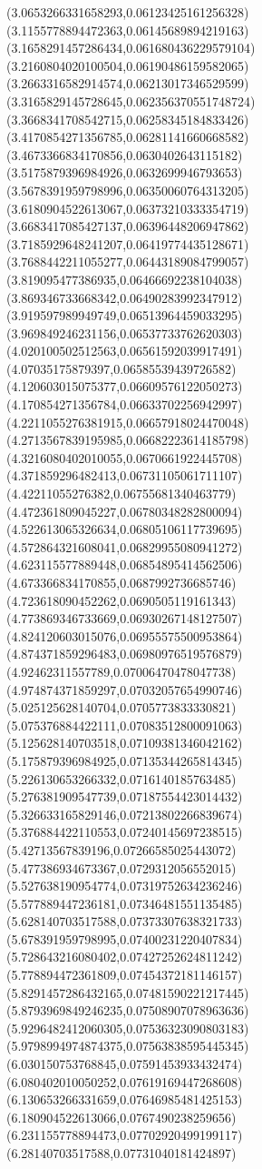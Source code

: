 {(3.0653266331658293,0.06123425161256328)
(3.1155778894472363,0.06145689894219163)
(3.1658291457286434,0.061680436229579104)
(3.2160804020100504,0.06190486159582065)
(3.2663316582914574,0.06213017346529599)
(3.3165829145728645,0.062356370551748724)
(3.3668341708542715,0.06258345184833426)
(3.4170854271356785,0.06281141660668582)
(3.4673366834170856,0.0630402643115182)
(3.5175879396984926,0.0632699946793653)
(3.5678391959798996,0.06350060764313205)
(3.6180904522613067,0.06373210333354719)
(3.6683417085427137,0.06396448206947862)
(3.7185929648241207,0.06419774435128671)
(3.7688442211055277,0.06443189084799057)
(3.819095477386935,0.06466692238104038)
(3.869346733668342,0.06490283992347912)
(3.919597989949749,0.06513964459033295)
(3.969849246231156,0.06537733762620303)
(4.020100502512563,0.06561592039917491)
(4.07035175879397,0.06585539439726582)
(4.120603015075377,0.06609576122050273)
(4.170854271356784,0.06633702256942997)
(4.2211055276381915,0.06657918024470048)
(4.2713567839195985,0.06682223614185798)
(4.3216080402010055,0.0670661922445708)
(4.371859296482413,0.06731105061711107)
(4.42211055276382,0.06755681340463779)
(4.472361809045227,0.06780348282800094)
(4.522613065326634,0.06805106117739695)
(4.572864321608041,0.06829955080941272)
(4.623115577889448,0.06854895414562506)
(4.673366834170855,0.0687992736685746)
(4.723618090452262,0.0690505119161343)
(4.773869346733669,0.06930267148127507)
(4.824120603015076,0.06955575500953864)
(4.874371859296483,0.06980976519576879)
(4.92462311557789,0.07006470478047738)
(4.974874371859297,0.07032057654990746)
(5.025125628140704,0.0705773833330821)
(5.075376884422111,0.07083512800091063)
(5.125628140703518,0.07109381346042162)
(5.175879396984925,0.07135344265814345)
(5.226130653266332,0.0716140185763485)
(5.276381909547739,0.07187554423014432)
(5.326633165829146,0.07213802266839674)
(5.376884422110553,0.07240145697238515)
(5.42713567839196,0.07266585025443072)
(5.477386934673367,0.0729312056552015)
(5.527638190954774,0.07319752634236246)
(5.577889447236181,0.07346481551135485)
(5.628140703517588,0.07373307638321733)
(5.678391959798995,0.07400231220407834)
(5.728643216080402,0.07427252624811242)
(5.778894472361809,0.07454372181146157)
(5.8291457286432165,0.07481590221217445)
(5.8793969849246235,0.07508907078963636)
(5.9296482412060305,0.07536323090803183)
(5.9798994974874375,0.07563838595445345)
(6.030150753768845,0.07591453933432474)
(6.080402010050252,0.07619169447268608)
(6.130653266331659,0.07646985481425153)
(6.180904522613066,0.0767490238259656)
(6.231155778894473,0.07702920499199117)
(6.28140703517588,0.07731040181424897)
}
